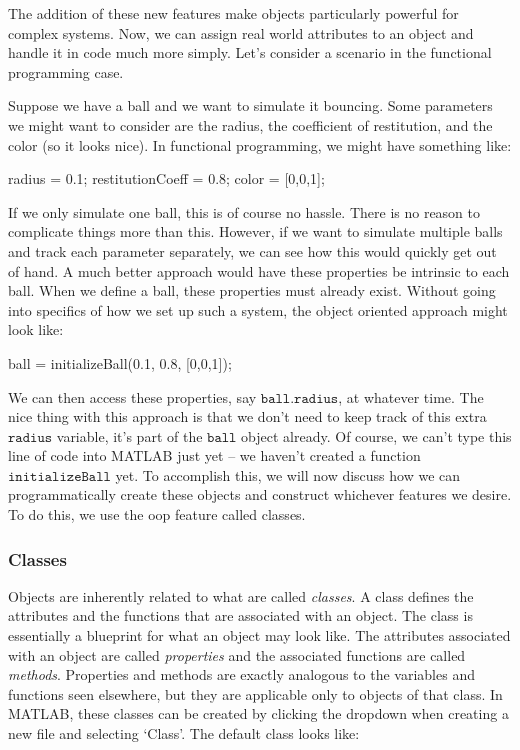 \documentclass[10pt, openany, titlepage]{book}
\theoremstyle{definition}
\begin{document}
The addition of these new features make objects particularly powerful for complex systems. Now, we can assign real world attributes to an object and handle it in code much more simply. Let's consider a scenario in the functional programming case.

Suppose we have a ball and we want to simulate it bouncing. Some parameters we might want to consider are the radius, the coefficient of restitution, and the color (so it looks nice). In functional programming, we might have something like:

\begin{matlabscript}{}
radius = 0.1; %
restitutionCoeff = 0.8;
color = [0,0,1];
\end{matlabscript}

If we only simulate one ball, this is of course no hassle. There is no reason to complicate things more than this. However, if we want to simulate multiple balls and track each parameter separately, we can see how this would quickly get out of hand. A much better approach would have these properties be intrinsic to each ball. When we define a ball, these properties must already exist. Without going into specifics of how we set up such a system, the object oriented approach might look like:

\begin{matlabscript}{}
ball = initializeBall(0.1, 0.8, [0,0,1]);
\end{matlabscript}

We can then access these properties, say $\texttt{ball.radius}$, at whatever time. The nice thing with this approach is that we don't need to keep track of this extra $\texttt{radius}$ variable, it's part of the $\texttt{ball}$ object already. Of course, we can't type this line of code into MATLAB just yet -- we haven't created a function $\texttt{initializeBall}$ yet. To accomplish this, we will now discuss how we can programmatically create these objects and construct whichever features we desire. To do this, we use the \gls{oop} feature called classes.

\subsubsection{Classes}

Objects are inherently related to what are called \textit{classes}. A class defines the attributes and the functions that are associated with an object. The class is essentially a blueprint for what an object may look like. The attributes associated with an object are called \textit{properties} and the associated functions are called \textit{methods}. Properties and methods are exactly analogous to the variables and functions seen elsewhere, but they are applicable only to objects of that class. In MATLAB, these classes can be created by clicking the dropdown when creating a new file and selecting `Class'. The default class looks like:
\end{document}

